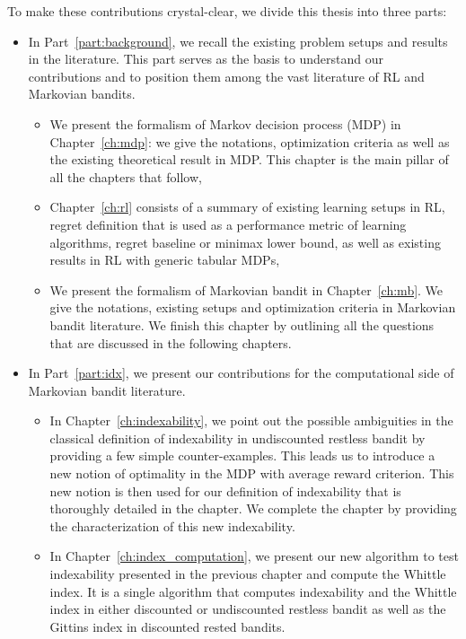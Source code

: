 To make these contributions crystal-clear, we divide this thesis into three parts:
\begin{itemize}
    \item In Part~\ref{part:background}, we recall the existing problem setups and results in the literature.
        This part serves as the basis to understand our contributions and to position them among the vast literature of RL and Markovian bandits.
        \begin{itemize}
            \item We present the formalism of Markov decision process (MDP) in Chapter~\ref{ch:mdp}: we give the notations, optimization criteria as well as the existing theoretical result in MDP.
                This chapter is the main pillar of all the chapters that follow,
            \item Chapter~\ref{ch:rl} consists of a summary of existing learning setups in RL, regret definition that is used as a performance metric of learning algorithms, regret baseline or minimax lower bound, as well as existing results in RL with generic tabular MDPs,
            \item We present the formalism of Markovian bandit in Chapter~\ref{ch:mb}. We give the notations, existing setups and optimization criteria in Markovian bandit literature.
                We finish this chapter by outlining all the questions that are discussed in the following chapters.
        \end{itemize}
    \item In Part~\ref{part:idx}, we present our contributions for the computational side of Markovian bandit literature.
        \begin{itemize}
            \item In Chapter~\ref{ch:indexability}, we point out the possible ambiguities in the classical definition of indexability in undiscounted restless bandit by providing a few simple counter-examples.
                This leads us to introduce a new notion of optimality in the MDP with average reward criterion.
                This new notion is then used for our definition of indexability that is thoroughly detailed in the chapter.
                We complete the chapter by providing the characterization of this new indexability.
            \item In Chapter~\ref{ch:index_computation}, we present our new algorithm to test indexability presented in the previous chapter and compute the Whittle index.
                It is a single algorithm that computes indexability and the Whittle index in either discounted or undiscounted restless bandit as well as the Gittins index in discounted rested bandits.

\end{itemize}
\end{itemize}
